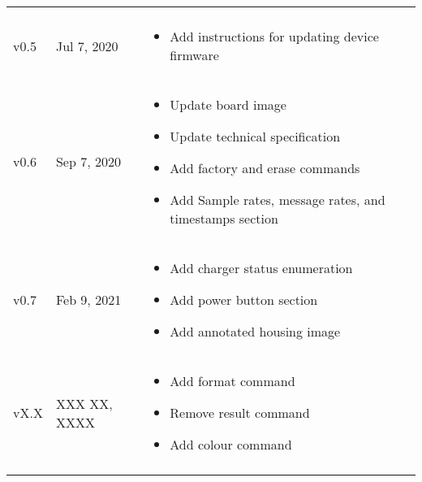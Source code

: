 \begin{longtable}{| >{\centering}p{} | p{} | >{\raggedright\arraybackslash}p{} |}
\begin{itemize}
        \end{itemize}\\
        v0.5 & Jul 7, 2020 &
        \begin{itemize}
			\item Add instructions for updating device firmware
        \end{itemize}\\
        v0.6 & Sep 7, 2020 &
        \begin{itemize}
			\item Update board image
			\item Update technical specification
			\item Add factory and erase commands
			\item Add Sample rates, message rates, and timestamps section
        \end{itemize}\\
        v0.7 & Feb 9, 2021 &
        \begin{itemize}
			\item Add charger status enumeration
			\item Add power button section
			\item Add annotated housing image
        \end{itemize}\\
        vX.X & XXX XX, XXXX &
        \begin{itemize}
			\item Add format command
			\item Remove result command
			\item Add colour command
        \end{itemize}\\
        \arrayrulecolor{gray!50}\hline
    \end{longtable}
\endgroup
